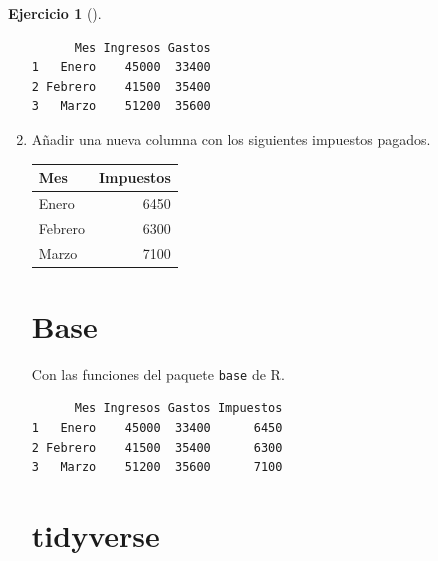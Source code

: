 \documentclass[
  a4paper,
]{scrreport}
\newenvironment{Shaded}{\begin{snugshade}}{\end{snugshade}}
\newcommand{\DecValTok}[1]{\textcolor[rgb]{0.68,0.00,0.00}{#1}}
\newcommand{\FunctionTok}[1]{\textcolor[rgb]{0.28,0.35,0.67}{#1}}
\newcommand{\NormalTok}[1]{\textcolor[rgb]{0.00,0.23,0.31}{#1}}
\newcommand{\OtherTok}[1]{\textcolor[rgb]{0.00,0.23,0.31}{#1}}
\newcommand{\SpecialCharTok}[1]{\textcolor[rgb]{0.37,0.37,0.37}{#1}}
\theoremstyle{definition}
\newtheorem{exercise}{Ejercicio}[chapter]
\theoremstyle{remark}
\begin{document}
\begin{exercise}[]
\begin{enumerate}
\begin{tcolorbox}
\begin{verbatim}
      Mes Ingresos Gastos
1   Enero    45000  33400
2 Febrero    41500  35400
3   Marzo    51200  35600
\end{verbatim}

  \end{tcolorbox}
\item
  Añadir una nueva columna con los siguientes impuestos pagados.

  \begin{longtable*}[t]{lr}
  \toprule
  Mes & Impuestos\\
  \midrule
  Enero & 6450\\
  Febrero & 6300\\
  Marzo & 7100\\
  \bottomrule
  \end{longtable*}

  \begin{tcolorbox}[enhanced jigsaw, breakable, toptitle=1mm, colbacktitle=quarto-callout-tip-color!10!white, rightrule=.15mm, opacityback=0, opacitybacktitle=0.6, titlerule=0mm, coltitle=black, colframe=quarto-callout-tip-color-frame, colback=white, bottomtitle=1mm, leftrule=.75mm, toprule=.15mm, title=\textcolor{quarto-callout-tip-color}{\faLightbulb}\hspace{0.5em}{Solución}, arc=.35mm, bottomrule=.15mm, left=2mm]

  \section{Base}

  Con las funciones del paquete \texttt{base} de R.

\begin{Shaded}
\end{Shaded}

\begin{verbatim}
      Mes Ingresos Gastos Impuestos
1   Enero    45000  33400      6450
2 Febrero    41500  35400      6300
3   Marzo    51200  35600      7100
\end{verbatim}

  \section{tidyverse}


\end{tcolorbox}
\end{enumerate}
\end{exercise}
\end{document}
